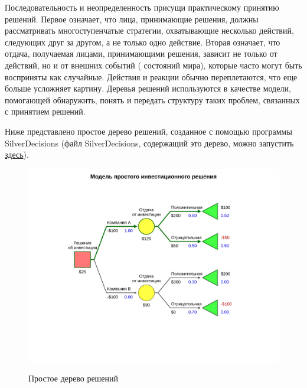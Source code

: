 Последовательность и неопределенность присущи практическому принятию решений. Первое означает, что лица, принимающие решения, должны рассматривать многоступенчатые стратегии, охватывающие несколько действий, следующих друг за другом, а не только одно действие. Вторая означает, что отдача, получаемая лицами, принимающими решения, зависит не только от действий, но и от внешних событий ( состояний мира), которые часто могут быть восприняты как случайные. Действия и реакции обычно переплетаются, что еще больше усложняет картину. Деревья решений используются в качестве модели, помогающей обнаружить, понять и передать структуру таких проблем, связанных с принятием решений.

Ниже представлено простое дерево решений, созданное с помощью программы SilverDecisions (файл SilverDecisions, содержащий это дерево, можно запустить \href{http://silverdecisions.pl/SilverDecisions.html?LOAD_SD_TREE_JSON=https://raw.githubusercontent.com/gubkin-rienm/isp/master/data/decision_tree/simple_invest_decision.json}{здесь}).

\begin{figure}[h!]
	\includegraphics[width= 15cm]{pics/simple_decision_tree_1.png} 
	\label{fig:sample}
	\caption{Простое дерево решений}
\end{figure}

